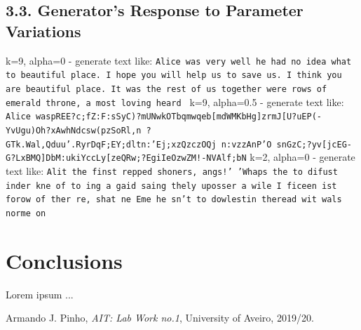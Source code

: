 \documentclass[12pt]{article}
\begin{document}
\subsection*{3.3. Generator's Response to Parameter Variations}

k=9, alpha=0 - generate text like: \texttt{Alice was very well he had no idea what to beautiful place. I hope you will help us to save us. I think you are beautiful place. It was the rest of us together were rows of emerald throne, a most loving heard } 
\newline
k=9, alpha=0.5 - generate text like: \texttt{Alice waspREE?c;fZ:F:sSyC)?mUNwkOTbqmwqeb[mdWMKbHg]zrmJ[U?uEP(-YvUgu)Oh?xAwhNdcsw(pzSoRl,n ?GTk.Wal,Qduu'.RyrDqF;EY;dltn:'Ej;xzQzczOQj n:vzzAnP'O snGzC;?yv[jcEG-G?LxBMQ]DbM:ukiYccLy[zeQRw;?EgiIeOzwZM!-NVAlf;bN} 
\newline
k=2, alpha=0 - generate text like: \texttt{Alit the finst repped shoners, angs!' 'Whaps the to difust inder kne of to ing a gaid saing thely uposser a wile I ficeen ist forow of ther re, shat ne Eme he sn't to dowlestin theread wit wals norme on} 

\section*{Conclusions}

Lorem ipsum ...

\begin{thebibliography}{9}
  

    Armando J. Pinho,
    \textit{AIT: Lab Work no.1},
    University of Aveiro,
    2019/20.
  
\end{thebibliography}

\clearpage
\end{document}
